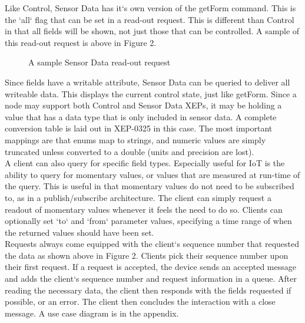Like Control, Sensor Data has it`s own version of the getForm command. This is the `all` flag that can be set in a read-out request. This is different than Control in that all fields will be shown, not just those that can be controlled. A sample of this read-out request is above in Figure 2.\\
\begin{figure}
\caption{A sample Sensor Data read-out request}
  
\end{figure}
Since fields have a writable attribute, Sensor Data can be queried to deliver all writeable data. This displays the current control state, just like getForm. Since a node may support both Control and Sensor Data XEPs, it may be holding a value that has a data type that is only included in sensor data. A complete conversion table is laid out in XEP-0325 in this case. The most important mappings are that enums map to strings, and numeric values are simply truncated unless converted to a double (units and precision are lost).\\
A client can also query for specific field types. Especially useful for IoT is the ability to query for momentary values, or values that are measured at run-time of the query. This is useful in that momentary values do not need to be subscribed to, as in a publish/subscribe architecture. The client can simply request a readout of momentary values whenever it feels the need to do so. Clients can optionally set `to` and `from` parameter values, specifying a time range of when the returned values should have been set.\\
Requests always come equipped with the client`s sequence number that requested the data as shown above in Figure 2. Clients pick their sequence number upon their first request. If a request is accepted, the device sends an accepted message and adds the client`s sequence number and request information in a queue. After reading the necessary data, the client then responds with the fields requested if possible, or an error. The client then concludes the interaction with a close message. A use case diagram is in the appendix.

